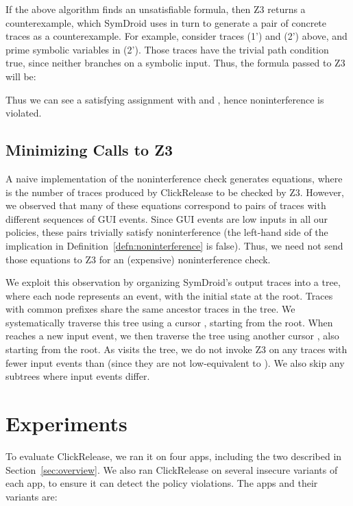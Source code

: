 \documentclass{llncs}
\newcommand{\sfmt}[1]{\textsf{#1}}
\newcommand{\toolname}{ClickRelease\xspace}
\begin{document}
If the above algorithm finds an unsatisfiable formula, then Z3 returns a counterexample, which
SymDroid uses in turn to generate a pair of concrete traces
as a counterexample.
For example, consider traces (1') and (2') above, and prime
symbolic variables in (2'). Those traces have the trivial path
condition \sfmt{true}, since neither branches on a symbolic
input. Thus, the formula passed to Z3 will be:

Thus we can see a satisfying
assignment with  and ,
hence noninterference is violated.


\subsection{Minimizing Calls to Z3}
\label{sec:z3-tree}

A naive implementation of the noninterference check generates 
equations, where  is the number of traces produced by \toolname{}
to be checked by Z3. However, we observed that many of these equations
correspond to pairs of traces with different sequences of GUI
events. Since GUI events are low inputs in all our policies, these
pairs trivially satisfy noninterference (the left-hand side of the
implication in Definition~\ref{defn:noninterference} is false).
 Thus, we need not send those
equations to Z3 for an (expensive) noninterference check.

We exploit this observation by organizing SymDroid's output traces
into a tree, where each node represents an event, with
the initial state at the root. Traces with common prefixes share the
same ancestor traces in the tree. We systematically traverse this tree
using a cursor , starting from the root. When  reaches a new
input event, we then traverse the tree using another cursor ,
also starting from the root. As  visits the tree, we do not
invoke Z3 on any traces with fewer input events than  (since they
are not low-equivalent to ). We also skip any subtrees where 
input events differ.


\section{Experiments}
\label{sec:experiments}

To evaluate \toolname{}, we ran it on four apps, including the two
described in Section~\ref{sec:overview}. We also ran \toolname{} on
several insecure variants of each app, to ensure it can detect the
policy violations. The apps and their variants
are:
\end{document}
